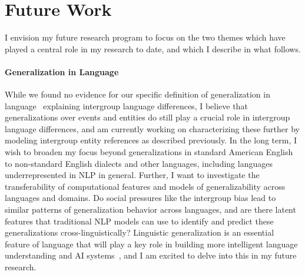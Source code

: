 \documentclass[11pt, letterpaper, biblatex]{practical-report}
\begin{document}
\section*{Future Work}

 I envision my future research program to focus on the two themes which have played a central role in my research to date, and which I describe in what follows.
 
\paragraph{Generalization in Language} While we found no evidence for our specific definition of generalization in language~\citep[specificity,][]{govindarajan-etal-2023-counterfactual} explaining intergroup language differences, I believe that generalizations over events and entities do still play a crucial role in intergroup language differences, and am currently working on characterizing these further by modeling intergroup entity references as described previously. In the long term, I wish to broaden my focus beyond generalizations in standard American English to non-standard English dialects and other languages, including languages underrepresented in NLP in general. Further, I want to investigate the transferability of computational features and models of generalizability across languages and domains. Do social pressures like the intergroup bias lead to similar patterns of generalization behavior across languages, and are there latent features that traditional NLP models can use to identify and predict these generalizations cross-linguistically? Linguistic generalization is an essential feature of language that will play a key role in building more intelligent language understanding and AI systems~\citep{bauer-etal-2018-commonsense}, and I am excited to delve into this in my future research.
 
\end{document}
